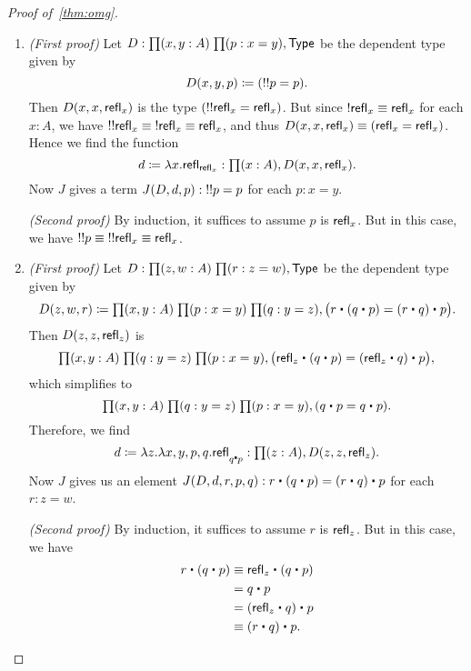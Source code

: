 \begin{proof}[Proof of~\autoref{thm:omg}]
\begin{enumerate}
    \noindent \emph{(Second proof)} By induction, it suffices to assume $p$ is $\refl x$.
    But in this case, we have $\opp{p} \ct p \jdeq \opp{\refl x} \ct \refl x \jdeq \refl x$.
  \item \emph{(First proof)} Let $D:\prd{x,y:A}{p:x=y} \type$ be the dependent type given by
    \begin{equation*}
      D(x,y,p)\coloneqq (\mathord{!{\mathord{!{p}}}}= p).
    \end{equation*}
    Then $D(x,x,\mathsf{refl}_{x})$ is the type $(\mathord{!{\mathord{!{\mathsf{refl}_{x}}}}}=\mathsf{refl}_{x})$.
    But since $\mathord{!{\mathsf{refl}_{x}}}\equiv \mathsf{refl}_{x}$ for each $x:A$, we have $\mathord{!{\mathord{!{\mathsf{refl}_{x}}}}}\equiv \mathord{!{\mathsf{refl}_{x}}} \equiv\mathsf{refl}_{x}$, and thus $D(x,x,\mathsf{refl}_{x})\equiv(\mathsf{refl}_{x}=\mathsf{refl}_{x})$.
    Hence we find the function
    \begin{equation*}
      d\defeq\lambda x.\refl{\refl{x}}:\prd{x:A} D(x,x,\refl{x}).
    \end{equation*}
    Now $J$ gives a term $J(D,d,p):\mathord{!{\mathord{!{p}}}}= p$ for each $p:x= y$.

    \noindent \emph{(Second proof)} By induction, it suffices to assume $p$ is $\refl x$.
    But in this case, we have $\mathord{!{\mathord{!{p}}}}\equiv \mathord{!{\mathord{!{\mathsf{refl}_{x}}}}} \equiv \mathsf{refl}_{x}$.
  \item \emph{(First proof)} Let $D:\prd{z,w:A}{r:z=w} \type$ be the dependent type given by
    \begin{equation*}
      D(z,w,r)\defeq\prd{x,y:A}{p:x= y}{q:y= z} \big(r\ct (q\ct p)=  (r\ct q)\ct p\big).
    \end{equation*}
    Then $D(z,z,\mathsf{refl}_{z})$ is
    \begin{equation*}
      \prd{x,y:A}{q:y= z}{p:x= y} \big(\refl{z}\ct(q\ct p)= (\refl{z}\ct q)\ct p\big),
    \end{equation*}
    which simplifies to
    \begin{equation*}
      \prd{x,y:A}{q:y= z}{p:x= y} (q\ct p= q\ct p).
    \end{equation*}
    Therefore, we find
    \begin{equation*}
      d\defeq\lambda z.\lambda x,y,p,q.\refl{q\ct p}:\prd{z:A} D(z,z,\refl{z}).
    \end{equation*}
    Now $J$ gives us an element $J(D,d,r,p,q):r\ct (q\ct p)= (r\ct q)\ct p$ for each $r:z= w$.

    \noindent \emph{(Second proof)} By induction, it suffices to assume $r$ is $\mathsf{refl}_{z}$.
    But in this case, we have
    \begin{align*}
      r\ct (q\ct p)
      &\jdeq \refl{z}\ct(q\ct p)\\
      &= q\ct p\\
      &= (\refl{z}\ct q)\ct p\\
      &\jdeq (r\ct q)\ct p.\qedhere
  \end{align*}
  \end{enumerate}
\end{proof}

